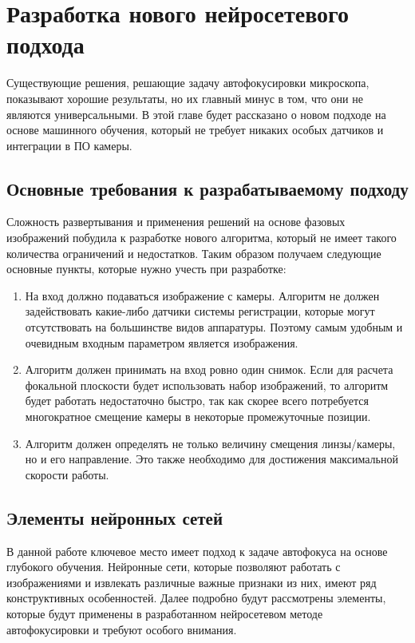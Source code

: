 \chapter{Разработка нового нейросетевого подхода} \label{ch2}
	

Существующие решения, решающие задачу автофокусировки микроскопа, показывают хорошие результаты, но их главный минус в том, что они не являются универсальными. В этой главе будет рассказано о новом подходе на основе машинного обучения, который не требует никаких особых датчиков и интеграции в ПО камеры.

\section{Основные требования к разрабатываемому подходу} \label{ch2:title-abbr} %

Сложность развертывания и применения решений на основе фазовых изображений побудила к разработке нового алгоритма, который не имеет такого количества ограничений и недостатков. Таким образом получаем следующие основные пункты, которые нужно учесть при разработке:

\begin{enumerate}[1.]
	\item На вход должно подаваться изображение с камеры. Алгоритм не должен задействовать какие-либо датчики системы регистрации, которые могут отсутствовать на большинстве видов аппаратуры. Поэтому самым удобным и очевидным входным параметром является изображения.
	\item Алгоритм должен принимать на вход ровно один снимок. Если для расчета фокальной плоскости будет использовать набор изображений, то алгоритм будет работать недостаточно быстро, так как скорее всего потребуется многократное смещение камеры в некоторые промежуточные позиции.
	\item Алгоритм должен определять не только величину смещения линзы/камеры, но и его направление. Это также необходимо для достижения максимальной скорости работы.
\end{enumerate}

\section{Элементы нейронных сетей}
В данной работе ключевое место имеет подход к задаче автофокуса на основе глубокого обучения. Нейронные сети, которые позволяют работать с изображениями и извлекать различные важные признаки из них, имеют ряд конструктивных особенностей. Далее подробно будут рассмотрены элементы, которые будут применены в разработанном нейросетевом методе автофокусировки и требуют особого внимания.

